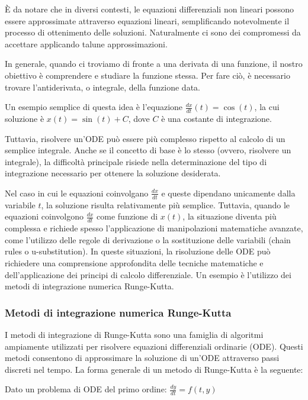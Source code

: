 È da notare che in diversi contesti, le equazioni differenziali non 
lineari possono essere approssimate attraverso equazioni lineari, 
semplificando notevolmente il processo di ottenimento delle soluzioni. Naturalmente ci sono dei compromessi da accettare applicando talune approssimazioni.

In generale, quando ci troviamo di fronte a una derivata di una 
funzione, il nostro obiettivo è comprendere e studiare la funzione stessa. 
Per fare ciò, è necessario trovare l'antiderivata, o integrale, della 
funzione data.

Un esempio semplice di questa idea è l'equazione 
$\frac{dx}{dt}(t) = \cos(t)$, la cui soluzione è $x(t) = \sin(t) + C$, 
dove $C$ è una costante di integrazione.

Tuttavia, risolvere un'ODE può essere più complesso rispetto al calcolo 
di un semplice integrale. Anche se il concetto di base è lo stesso 
(ovvero, risolvere un integrale), la difficoltà principale risiede 
nella determinazione del tipo di integrazione necessario per ottenere 
la soluzione desiderata.

Nel caso in cui le equazioni coinvolgano $\frac{dx}{dt}$ e queste 
dipendano unicamente dalla variabile $t$, la soluzione risulta 
relativamente più semplice. Tuttavia, quando le equazioni coinvolgono 
$\frac{dx}{dt}$ come funzione di $x(t)$, la situazione diventa più 
complessa e richiede spesso l'applicazione di manipolazioni matematiche 
avanzate, come l'utilizzo delle regole di derivazione o la sostituzione 
delle variabili (chain rules o u-substitution). In queste situazioni, 
la risoluzione delle ODE può richiedere una comprensione approfondita 
delle tecniche matematiche e dell'applicazione dei principi di calcolo 
differenziale. Un esempio è l'utilizzo dei metodi di integrazione numerica Runge-Kutta.

\subsubsection*{Metodi di integrazione numerica Runge-Kutta}
I metodi di integrazione di Runge-Kutta \cite{ABELL2023283} \cite{GOTTLIEB2016549} sono una famiglia di algoritmi ampiamente utilizzati per risolvere equazioni differenziali ordinarie (ODE). Questi metodi consentono di approssimare la soluzione di un'ODE attraverso passi discreti nel tempo. La forma generale di un metodo di Runge-Kutta è la seguente:

Dato un problema di ODE del primo ordine:
\(\frac{dy}{dt} = f(t, y)\)

